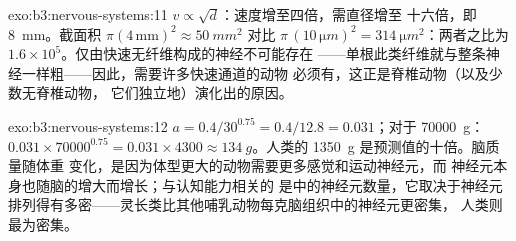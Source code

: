 \begin{solution}{exo:b3:nervous-systems:11}
$v \propto \sqrt{d}$：速度增至四倍，需直径增至
十六倍，即 \qty{8}{mm}。截面积 $\pi(4\,\text{mm})^{2} \approx \qty{50}{mm^2}$
对比 $\pi\,(10\,\unit{\micro m})^{2} = \qty{314}{\micro m^2}$：两者之比为
$1.6\times 10^{5}$。仅由快速无纤维构成的神经不可能存在
——单根此类纤维就与整条神经一样粗——因此，需要许多快速通道的动物
必须有，这正是脊椎动物（以及少数无脊椎动物，
它们独立地）演化出的原因。
\end{solution}

\begin{solution}{exo:b3:nervous-systems:12}
$a = 0.4/30^{0.75} = 0.4/12.8 = 0.031$；对于 \qty{70000}{g}：$0.031\times
\num{70000}^{0.75} = 0.031\times 4300 \approx \qty{134}{g}$。人类的
\qty{1350}{g} 是预测值的十倍。脑质量随体重
变化，是因为体型更大的动物需要更多感觉和运动神经元，而
神经元本身也随脑的增大而增长；与认知能力相关的
是中的神经元数量，它取决于神经元
排列得有多密——灵长类比其他哺乳动物每克脑组织中的神经元更密集，
人类则最为密集。
\end{solution}

